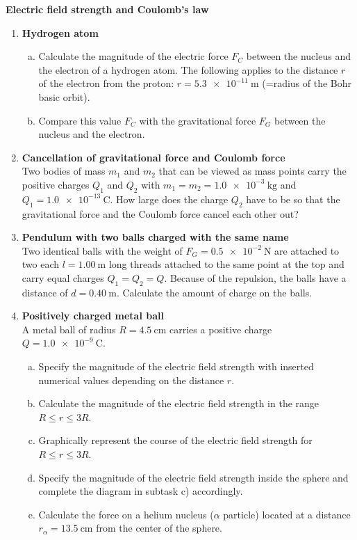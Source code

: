 \documentclass[a4paper]{article}
\begin{document}
	{\bf Electric field strength and Coulomb's law }\\
	\begin{enumerate}[1.]
		
		\item {\bf Hydrogen atom}
		\begin{enumerate}[a)]
			\item Calculate the magnitude of the electric force $F_C$ between the nucleus and the electron of a hydrogen atom. The following applies to the distance $r$ of the electron from the proton: $r=\SI{5,3e-11}{\meter}$ (=radius of the Bohr basic orbit).
			\item Compare this value $F_C$ with the gravitational force $F_G$ between the nucleus and the electron.
		\end{enumerate}
		
		\item {\bf Cancellation of gravitational force and Coulomb force}\\
		Two bodies of mass $m_1$ and $m_2$ that can be viewed as mass points carry the positive charges $Q_1$ and $Q_2$ with $m_1=m_2=\SI{1,0e-3}{\kilogram} $ and \\
		$Q_1= \SI{1.0e-13}{\coulomb}$. How large does the charge $Q_2$ have to be so that the gravitational force and the Coulomb force cancel each other out?
		
		\item {\bf Pendulum with two balls charged with the same name}\\
		Two identical balls with the weight of $F_G=\SI{0.5e-2}{\newton}$ are attached to two each
		$l=\SI{1.00}{\meter}$ long threads attached to the same point at the top and carry equal charges $Q_1=Q_2=Q$. Because of the repulsion, the balls have a distance of $d=\SI{0.40}{\meter}$. Calculate the amount of charge on the balls.
		
		\item {\bf Positively charged metal ball}\\
		A metal ball of radius $R=\SI{4.5}{\centi\meter}$ carries a positive charge \\
		$Q=\SI{1.0e-9}{\coulomb}$.
		\begin{enumerate}[a)]
			\item Specify the magnitude of the electric field strength with inserted numerical values depending on the distance $r$.
			\item Calculate the magnitude of the electric field strength in the range \\ $R \le r \le 3 R$.
			\item Graphically represent the course of the electric field strength for $R \le r \le 3 R$.
			\item Specify the magnitude of the electric field strength inside the sphere and complete the diagram in subtask c) accordingly.
			\item Calculate the force on a helium nucleus ($\alpha$ particle) located at a distance $r_{\alpha}=\SI{13.5}{\centi\meter}$ from the center of the sphere.
		\end{enumerate}
		

\end{enumerate}
\end{document}
